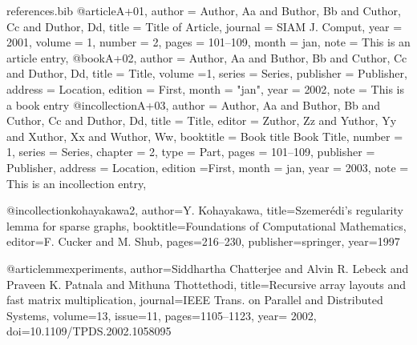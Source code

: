 \RequirePackage{filecontents}
\begin{filecontents}{references.bib}
@article{A+01,
  author = {Author, Aa and Buthor, Bb and Cuthor, Cc and Duthor, Dd},
  title = {Title of Article},
  journal = {SIAM J. Comput},
  year = {2001},
  volume = {1},
  number = {2},
  pages = {101--109},
  month = jan,
  note = {This is an article entry},
}
@book{A+02,
  author = {Author, Aa and Buthor, Bb and Cuthor, Cc and Duthor, Dd},
  title = {Title},
  volume ={1},
  series = {Series},
  publisher = {Publisher},
  address = {Location},
  edition = {First},
  month = "jan",
  year = {2002},
  note = {This is a book entry}
}
@incollection{A+03,
  author = {Author, Aa and Buthor, Bb and Cuthor, Cc and Duthor, Dd},
  title = {Title},
  editor = {Zuthor, Zz and Yuthor, Yy and Xuthor, Xx and Wuthor, Ww},
  booktitle = {Book title Book Title},
  number = {1},
  series = {Series},
  chapter = {2},
  type = {Part},
  pages = {101--109},
  publisher = {Publisher},
  address = {Location},
  edition ={First},
  month = jan,
  year = {2003},
  note = {This is an incollection entry},
}

@incollection{kohayakawa2,
author={Y. Kohayakawa},
title={{Szemer\'{e}di's} regularity lemma for sparse graphs},
booktitle={Foundations of Computational Mathematics},
editor={F. Cucker and M. Shub},
pages={216--230},
publisher=springer,
year={1997}
}

@article{mmexperiments,
author={Siddhartha Chatterjee and  Alvin R. Lebeck and  Praveen K. Patnala and Mithuna Thottethodi},
title={Recursive array layouts and fast matrix multiplication},
journal={IEEE Trans. on Parallel and Distributed Systems},
volume={13},
issue={11},
pages={1105--1123},
year= {2002},
doi={10.1109/TPDS.2002.1058095}
}

\end{filecontents}



\documentclass{article}
\providecommand\noopsort[1]{}
\usepackage{xpatch}
\usepackage[%
 backend   =  biber   , 
 style     = trad-plain,
]{biblatex}



\nocite{*}
\printbibliography

